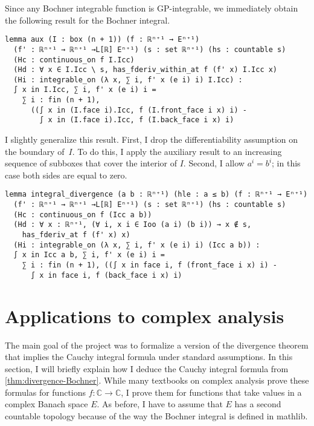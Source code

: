 \documentclass[a4paper, UKenglish,cleveref, autoref, thm-restate]{lipics-v2021}
\newcommand{\bbC}{\mathbb{C}}
\begin{document}
Since any Bochner integrable function is GP-integrable, we immediately
obtain the following result for the Bochner integral.

\begin{lstlisting}
lemma aux (I : box (n + 1)) (f : ℝⁿ⁺¹ → Eⁿ⁺¹)
  (f' : ℝⁿ⁺¹ → ℝⁿ⁺¹ →L[ℝ] Eⁿ⁺¹) (s : set ℝⁿ⁺¹) (hs : countable s)
  (Hc : continuous_on f I.Icc)
  (Hd : ∀ x ∈ I.Icc \ s, has_fderiv_within_at f (f' x) I.Icc x)
  (Hi : integrable_on (λ x, ∑ i, f' x (e i) i) I.Icc) :
  ∫ x in I.Icc, ∑ i, f' x (e i) i =
    ∑ i : fin (n + 1),
      ((∫ x in (I.face i).Icc, f (I.front_face i x) i) -
        ∫ x in (I.face i).Icc, f (I.back_face i x) i)
\end{lstlisting}

I slightly generalize this result. First, I drop the differentiability
assumption on the boundary of~\(I\). To do this, I apply the auxiliary
result to an increasing sequence of subboxes that cover the interior
of \(I\). Second, I allow \(a^{i}=b^{i}\); in this case both sides are
equal to zero.

\begin{lstlisting}[caption={The divergence theorem for the Bochner integral},label=lst:divergence-bochner]
lemma integral_divergence (a b : ℝⁿ⁺¹) (hle : a ≤ b) (f : ℝⁿ⁺¹ → Eⁿ⁺¹)
  (f' : ℝⁿ⁺¹ → ℝⁿ⁺¹ →L[ℝ] Eⁿ⁺¹) (s : set ℝⁿ⁺¹) (hs : countable s)
  (Hc : continuous_on f (Icc a b))
  (Hd : ∀ x : ℝⁿ⁺¹, (∀ i, x i ∈ Ioo (a i) (b i)) → x ∉ s,
    has_fderiv_at f (f' x) x)
  (Hi : integrable_on (λ x, ∑ i, f' x (e i) i) (Icc a b)) :
  ∫ x in Icc a b, ∑ i, f' x (e i) i =
    ∑ i : fin (n + 1), ((∫ x in face i, f (front_face i x) i) -
      ∫ x in face i, f (back_face i x) i)
\end{lstlisting}

\section{Applications to complex analysis}%
\label{sec:appl-compl-analys}

The main goal of the project was to formalize a version of the
divergence theorem that implies the Cauchy integral formula under
standard assumptions. In this section, I will briefly explain how I
deduce the Cauchy integral formula from
\autoref{thm:divergence-Bochner}. While many textbooks on complex
analysis prove these formulas for functions \(f\colon \bbC\to \bbC\), I
prove them for functions that take values in a complex Banach space
\(E\). As before, I have to assume that \(E\) has a second countable
topology because of the way the Bochner integral is defined in
mathlib.
\end{document}

